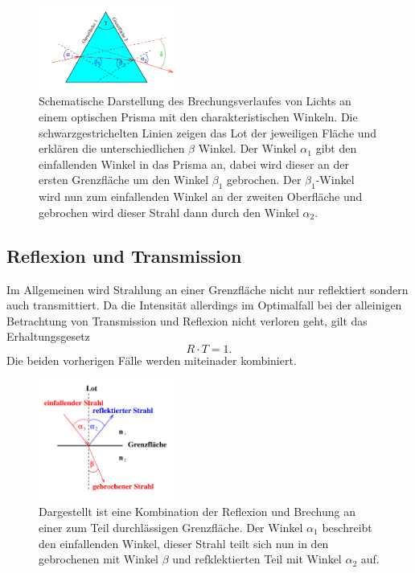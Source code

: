 \begin{figure}
    \centering
    \includegraphics[width=0.4\textwidth]{bilder/5.png}
    \caption{Schematische Darstellung des Brechungsverlaufes von Lichts an einem optischen Prisma mit den charakteristischen Winkeln. Die schwarzgestrichelten Linien zeigen das Lot der jeweiligen Fläche und erklären die unterschiedlichen $\beta$ Winkel. Der Winkel $\alpha_1$
    gibt den einfallenden Winkel in das Prisma an, dabei wird dieser an der ersten Grenzfläche um den Winkel $\beta_1$ gebrochen. Der $\beta_1$-Winkel wird nun zum einfallenden Winkel an der zweiten Oberfläche und gebrochen wird dieser Strahl dann durch den Winkel $\alpha_2$. \cite{skript}}
    \label{fig:prisma}
\end{figure}

\newpage

\subsection{Reflexion und Transmission}
Im Allgemeinen wird Strahlung an einer Grenzfläche nicht nur reflektiert sondern auch transmittiert. Da die Intensität allerdings im Optimalfall bei der alleinigen Betrachtung von Transmission und Reflexion nicht verloren geht, gilt das Erhaltungsgesetz
\begin{equation*}
R \cdot T = 1.
\end{equation*}
Die beiden vorherigen Fälle werden miteinader kombiniert.
\begin{figure}
    \centering
    \includegraphics[width=0.4\textwidth]{bilder/3.png}
    \caption{Dargestellt ist eine Kombination der Reflexion und Brechung an einer zum Teil durchlässigen Grenzfläche. Der Winkel $\alpha_1$ beschreibt den einfallenden Winkel, dieser Strahl teilt sich nun in den gebrochenen mit Winkel $\beta$ und refklektierten Teil mit Winkel $\alpha_2$ auf. \cite{skript}}
    \label{fig:combo}
\end{figure}

